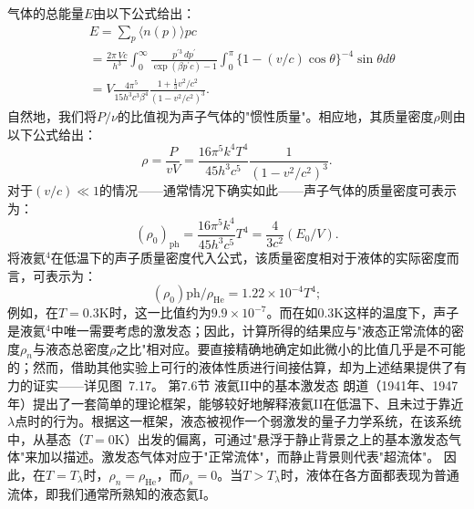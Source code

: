 气体的总能量\(E\)由以下公式给出：
\begin{equation}\tag{7.5.15}\label{eq:7.5.15}
\begin{array}{rl} & { E = \sum _ { p } \langle n ( p ) \rangle p c } \\& {  = \frac { 2 \pi \, V c } { h ^{3} } \int _ { 0 } ^{\infty} \frac { p ^{\prime 3} \, d p ^{\prime} } { \exp ( \beta p ^{\prime} c ) - 1 } \int _ { 0 } ^{\pi} \{ 1 - ( v / c ) \cos \theta \} ^{- 4} \sin \theta d \theta } \\& {  = V \frac { 4 \pi ^{5} } { 15 h ^{3} c ^{3} \beta ^{4} } \frac { 1 + \frac { 1 } { 3 } v ^{2} / c ^{2} } { ( 1 - v ^{2} / c ^{2} ) ^{3} } . } \end{array}
\end{equation}
自然地，我们将\(P/\nu\)的比值视为声子气体的"惯性质量"。相应地，其质量密度\(\rho\)则由以下公式给出：
\begin{equation}\tag{7.5.16}\label{eq:7.5.16}
\rho = \frac { P } { v V } = \frac { 16 \pi ^{5} k ^{4} T ^{4} } { 45 h ^{3} c ^{5} } \frac { 1 } { ( 1 - v ^{2} / c ^{2} ) ^{3} } .
\end{equation}
对于\((v/c) \ll 1\)的情况——通常情况下确实如此——声子气体的质量密度可表示为：
\begin{equation}\tag{7.5.17}\label{eq:7.5.17}
( \rho _ { 0 } ) _ { \mathrm { p h } } = \frac { 16 \pi ^{5} k ^{4} } { 45 h ^{3} c ^{5} } T ^{4} = \frac { 4 } { 3 c ^{2} } ( E _ { 0 } / V ) .
\end{equation}
将液氦\(^{4}\)在低温下的声子质量密度代入公式，该质量密度相对于液体的实际密度而言，可表示为：
\begin{equation}\tag{7.5.18}\label{eq:7.5.18}
( \rho _ { 0 } ) \mathrm { p h } / \rho _ { \mathrm { H e } } = 1 . 22 \times 10 ^{- 4} T ^{4} ;
\end{equation}
例如，在\(T=0.3\mathrm{K}\)时，这一比值约为\(9.9\times10^{-7}\)。而在如\(0.3\mathrm{K}\)这样的温度下，声子是液氦\(^{4}\)中唯一需要考虑的激发态；因此，计算所得的结果应与"液态正常流体的密度\(\rho_{n}\)与液态总密度\(\rho\)之比"相对应。要直接精确地确定如此微小的比值几乎是不可能的；然而，借助其他实验上可行的液体性质进行间接估算，却为上述结果提供了有力的证实——详见图~7.17。
第7.6节 液氦II中的基本激发态
朗道（1941年、1947年）提出了一套简单的理论框架，能够较好地解释液氦II在低温下、且未过于靠近\(\lambda\)点时的行为。根据这一框架，液态被视作一个弱激发的量子力学系统，在该系统中，从基态（\(T = 0\mathrm{K}\)）出发的偏离，可通过"悬浮于静止背景之上的基本激发态气体"来加以描述。激发态气体对应于"正常流体"，而静止背景则代表"超流体"。
因此，在\(T=T_{\lambda}\)时，\(\rho_{n}=\rho_{\mathrm{He}}\)，而\(\rho_{s}=0\)。当\(T>T_{\lambda}\)时，液体在各方面都表现为普通流体，即我们通常所熟知的液态氦I。
